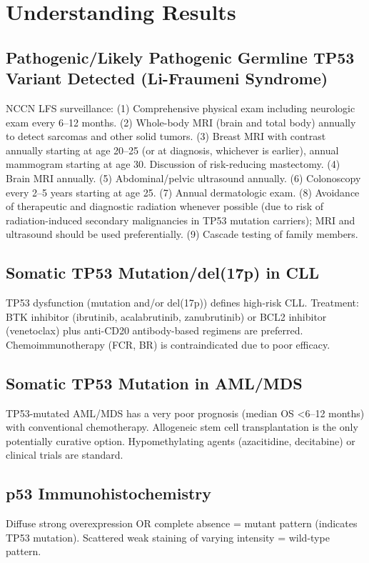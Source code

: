 \section*{Understanding Results}

\subsection*{Pathogenic/Likely Pathogenic Germline TP53 Variant Detected (Li-Fraumeni Syndrome)}
NCCN LFS surveillance: (1) Comprehensive physical exam including neurologic exam every 6--12 months. (2) Whole-body MRI (brain and total body) annually to detect sarcomas and other solid tumors. (3) Breast MRI with contrast annually starting at age 20--25 (or at diagnosis, whichever is earlier), annual mammogram starting at age 30. Discussion of risk-reducing mastectomy. (4) Brain MRI annually. (5) Abdominal/pelvic ultrasound annually. (6) Colonoscopy every 2--5 years starting at age 25. (7) Annual dermatologic exam. (8) Avoidance of therapeutic and diagnostic radiation whenever possible (due to risk of radiation-induced secondary malignancies in TP53 mutation carriers); MRI and ultrasound should be used preferentially. (9) Cascade testing of family members.

\subsection*{Somatic TP53 Mutation/del(17p) in CLL}
TP53 dysfunction (mutation and/or del(17p)) defines high-risk CLL. Treatment: BTK inhibitor (ibrutinib, acalabrutinib, zanubrutinib) or BCL2 inhibitor (venetoclax) plus anti-CD20 antibody-based regimens are preferred. Chemoimmunotherapy (FCR, BR) is contraindicated due to poor efficacy.

\subsection*{Somatic TP53 Mutation in AML/MDS}
TP53-mutated AML/MDS has a very poor prognosis (median OS <6--12 months) with conventional chemotherapy. Allogeneic stem cell transplantation is the only potentially curative option. Hypomethylating agents (azacitidine, decitabine) or clinical trials are standard.

\subsection*{p53 Immunohistochemistry}
Diffuse strong overexpression OR complete absence = mutant pattern (indicates TP53 mutation). Scattered weak staining of varying intensity = wild-type pattern.

